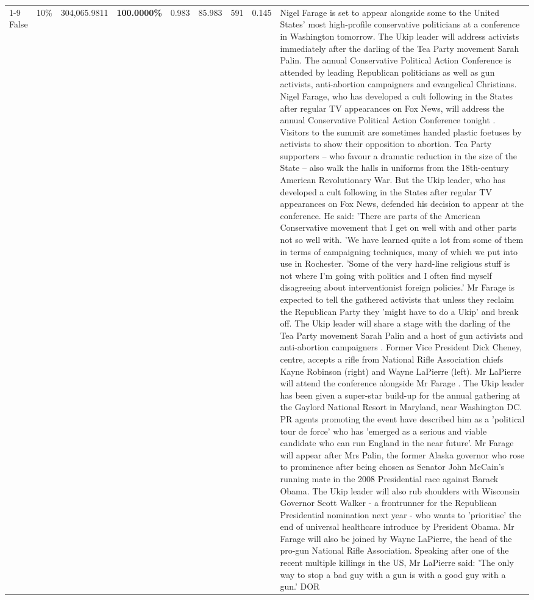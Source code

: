 \begin{table}[H]
\begin{tabular}{lllrlllll}
\cline{1-9} \cline{2-9}
False & 10\% & \color{red} 304,065.9811 & \bfseries \color{red} 100.0000\% & 0.983 & 85.983 & 591 & 0.145 & Nigel Farage is set to appear alongside some to the United States' most high-profile conservative politicians at a conference in Washington tomorrow. The Ukip leader will address activists immediately after the darling of the Tea Party movement Sarah Palin. The annual Conservative Political Action Conference is attended by leading Republican politicians as well as gun activists, anti-abortion campaigners and evangelical Christians. Nigel Farage, who has developed a cult following in the States after regular TV appearances on Fox News, will address the annual Conservative Political Action Conference tonight . Visitors to the summit are sometimes handed plastic foetuses by activists to show their opposition to abortion. Tea Party supporters – who favour a dramatic reduction in the size of the State – also walk the halls in uniforms from the 18th-century American Revolutionary War. But the Ukip leader, who has developed a cult following in the States after regular TV appearances on Fox News, defended his decision to appear at the conference. He said: 'There are parts of the American Conservative movement that I get on well with and other parts not so well with. 'We have learned quite a lot from some of them in terms of campaigning techniques, many of which we put into use in Rochester. 'Some of the very hard-line religious stuff is not where I'm going with politics and I often find myself disagreeing about interventionist foreign policies.' Mr Farage is expected to tell the gathered activists that unless they reclaim the Republican Party they 'might have to do a Ukip' and break off. The Ukip leader will share a stage with the darling of the Tea Party movement Sarah Palin and a host of gun activists and anti-abortion campaigners . Former Vice President Dick Cheney, centre, accepts a rifle from National Rifle Association chiefs Kayne Robinson (right) and Wayne LaPierre (left). Mr LaPierre will attend the conference alongside Mr Farage . The Ukip leader has been given a super-star build-up for the annual gathering at the Gaylord National Resort in Maryland, near Washington DC. PR agents promoting the event have described him as a 'political tour de force' who has 'emerged as a serious and viable candidate who can run England in the near future'. Mr Farage will appear after Mrs Palin, the former Alaska governor who rose to prominence after being chosen as Senator John McCain's running mate in the 2008 Presidential race against Barack Obama. The Ukip leader will also rub shoulders with Wisconsin Governor Scott Walker - a frontrunner for the Republican Presidential nomination next year - who wants to 'prioritise' the end of universal healthcare introduce by President Obama. Mr Farage will also be joined by Wayne LaPierre, the head of the pro-gun National Rifle Association. Speaking after one of the recent multiple killings in the US, Mr LaPierre said: 'The only way to stop a bad guy with a gun is with a good guy with a gun.' DOR \\

\end{tabular}
\end{table}
